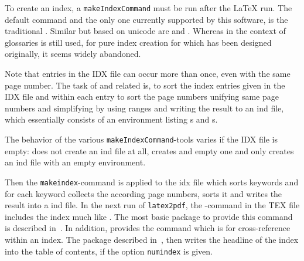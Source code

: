 To create an index, 
a \texttt{makeIndexCommand} must be run after the \LaTeX{} run. 
The default command and the only one currently supported by this software, 
is the traditional . 
Similar but based on unicode are  and . 
Whereas in the context of glossaries  is still used, 
for pure index creation for which  has been designed originally, 
it seems widely abandoned. 

Note that entries in the IDX file can occur more than once, 
even with the same page number. 
The task of  and related is, 
to sort the index entries given in the IDX file 
and within each entry to sort the page numbers 
unifying same page numbers and simplifying by using ranges 
and writing the result to an \gls{ind} file, 
which essentially consists of an  environment 
listing s and s. 


The behavior of the various \texttt{makeIndexCommand}-tools varies 
if the IDX file is empty:  does not create an \gls{ind} file at all, 
 creates and empty one and only  
creates an \gls{ind} file with an empty  environment. 





Then the \texttt{makeindex}-command is applied to the \gls{idx} file 
which sorts keywords and for each keyword collects the according page numbers, 
sorts it and writes the result into a \gls{ind} file. 
In the next run of \texttt{latex2pdf}, 
the -command in the TEX file includes the index much like . 
The most basic package to provide this command 
is  described in~\cite{MkidxShIdxP}. 
In addition,  provides the command  
which is for cross-reference within an index. 
The package  described in~\cite{TocBibIndP}, 
then writes the headline of the index into the table of contents, 
if the option \texttt{numindex} is given.

